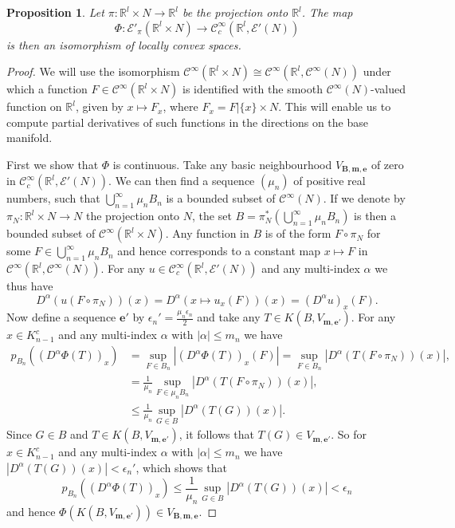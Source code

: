 \documentclass[a4paper]{amsart}
\newtheorem{prop}[dfn]{Proposition}
\newcommand{\RR}{\mathbb{R}}
\newcommand{\cE}{\mathcal{E}}
\newcommand{\com}{\mathbin{{\scriptstyle \circ }}}
\newcommand{\C}{\mathord{\mathcal{C}^{\infty}}}
\newcommand{\Cc}{\mathord{\mathcal{C}^{\infty}_{c}}}
\begin{document}
\begin{prop}
Let $\pi:\RR^{l}\times N\to \RR^{l}$ be the projection onto $\RR^{l}$. The map 
\[
\Phi:\cE'_{\pi}(\RR^{l}\times N)\to\Cc(\RR^{l},\cE'(N))
\]
is then an isomorphism of locally convex spaces.
\end{prop}
\begin{proof}
We will use the isomorphism $\C(\RR^{l}\times N)\cong\C(\RR^{l},\C(N))$ under which
a function $F\in\C(\RR^{l}\times N)$ is identified with the smooth $\C(N)$-valued function on $\RR^{l}$, given by $x\mapsto F_{x}$,
where $F_{x}=F|\{x\}\times N$. This will enable us to compute partial derivatives of such functions in the directions on the base manifold.

First we show that $\Phi$ is continuous. Take any basic neighbourhood $V_{\textbf{B},\textbf{m},\textbf{e}}$ of zero
in $\Cc(\RR^{l},\cE'(N))$. We can then find a sequence $(\mu_{n})$ of positive real numbers, such that $\bigcup_{n=1}^{\infty}\mu_{n}B_{n}$
is a bounded subset of $\C(N)$. If we denote by $\pi_{N}:\RR^{l}\times N\to N$ the projection onto $N$, the set 
$B=\pi_{N}^{*}\left(\bigcup_{n=1}^{\infty}\mu_{n}B_{n}\right)$ is then a bounded subset of $\C(\RR^{l}\times N)$. Any function
in $B$ is of the form $F\com\pi_{N}$ for some $F\in\bigcup_{n=1}^{\infty}\mu_{n}B_{n}$ and hence corresponds to a
constant map $x\mapsto F$ in $\C(\RR^{l},\C(N))$. For any $u\in\Cc(\RR^{l},\cE'(N))$ and any multi-index $\alpha$ we thus have
\[
D^{\alpha}(u(F\com\pi_{N}))(x)=D^{\alpha}(x\mapsto u_{x}(F))(x)=(D^{\alpha}u)_{x}(F).
\]
Now define a sequence $\textbf{e}'$ by $\epsilon_{n}'=\frac{\mu_{n}\epsilon_{n}}{2}$ and take any $T\in K(B,V_{\textbf{m},\textbf{e}'})$.
For any $x\in K_{n-1}^{c}$ and any multi-index $\alpha$ with $|\alpha|\leq m_{n}$ we have
\begin{align*}
p_{B_{n}}((D^{\alpha}\Phi(T))_{x})&=\sup_{F\in B_{n}}|(D^{\alpha}\Phi(T))_{x}(F)|
=\sup_{F\in B_{n}}|D^{\alpha}(T(F\com\pi_{N}))(x)|, \\
&=\frac{1}{\mu_{n}}\sup_{F\in \mu_{n}B_{n}}|D^{\alpha}(T(F\com\pi_{N}))(x)|, \\
&\leq \frac{1}{\mu_{n}}\sup_{G\in B}|D^{\alpha}(T(G))(x)|.
\end{align*}
Since $G\in B$ and $T\in K(B,V_{\textbf{m},\textbf{e}'})$, it follows that $T(G)\in V_{\textbf{m},\textbf{e}'}$. So for 
$x\in K_{n-1}^{c}$ and any multi-index $\alpha$ with $|\alpha|\leq m_{n}$ we have $|D^{\alpha}(T(G))(x)|<\epsilon_{n}'$, which shows that
\[
p_{B_{n}}((D^{\alpha}\Phi(T))_{x})\leq \frac{1}{\mu_{n}}\sup_{G\in B}|D^{\alpha}(T(G))(x)|<\epsilon_{n}
\] 
and hence $\Phi(K(B,V_{\textbf{m},\textbf{e}'}))\in V_{\textbf{B},\textbf{m},\textbf{e}}$.


\end{proof}
\end{document}
